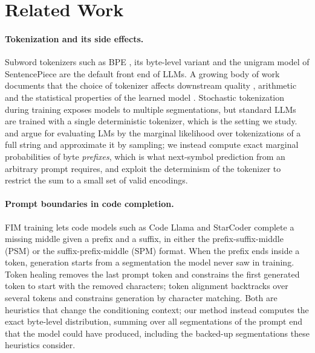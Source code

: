 \documentclass{article} %
\begin{document}
\section{Related Work}
\label{sec:related_work}
\paragraph{Tokenization and its side effects.}
Subword tokenizers such as BPE \citep{sennrich2016bpe}, its byte-level variant \citep{wang2020bytelevel,radford2019gpt2} and the unigram model of SentencePiece \citep{kudo2018sentencepiece,kudo2018subword} are the default front end of LLMs. A growing body of work documents that the choice of tokenizer affects downstream quality \citep{bostrom2020bpe,rust2021tokenizer,ali2023tokenizer,schmidt2024tokenization}, arithmetic \citep{singh2024tokenization} and the statistical properties of the learned model \citep{zouhar2023noiseless,gastaldi2024foundations}. Stochastic tokenization during training \citep{kudo2018subword,provilkov2020bpedropout} exposes models to multiple segmentations, but standard LLMs are trained with a single deterministic tokenizer, which is the setting we study. \citet{cao2021marginal} and \citet{chirkova2023marginalize} argue for evaluating LMs by the marginal likelihood over tokenizations of a full string and approximate it by sampling; we instead compute exact marginal probabilities of byte \emph{prefixes}, which is what next-symbol prediction from an arbitrary prompt requires, and exploit the determinism of the tokenizer to restrict the sum to a small set of valid encodings.

\paragraph{Prompt boundaries in code completion.}
FIM training \citep{bavarian2022fim,fried2023incoder} lets code models such as Code Llama \citep{roziere2023codellama} and StarCoder \citep{li2023starcoder} complete a missing middle given a prefix and a suffix, in either the prefix-suffix-middle (PSM) or the suffix-prefix-middle (SPM) format. When the prefix ends inside a token, generation starts from a segmentation the model never saw in training. Token healing \citep{dagan2024tokenizer} removes the last prompt token and constrains the first generated token to start with the removed characters; token alignment \citep{athiwaratkun2024alignment} backtracks over several tokens and constrains generation by character matching. Both are heuristics that change the conditioning context; our method instead computes the exact byte-level distribution, summing over all segmentations of the prompt end that the model could have produced, including the backed-up segmentations these heuristics consider.
\end{document}
